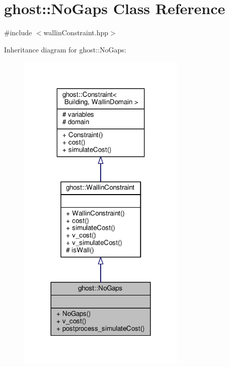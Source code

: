 \hypertarget{classghost_1_1NoGaps}{\section{ghost\-:\-:No\-Gaps Class Reference}
\label{classghost_1_1NoGaps}
}


{\ttfamily \#include $<$wallin\-Constraint.\-hpp$>$}



Inheritance diagram for ghost\-:\-:No\-Gaps\-:\nopagebreak
\begin{figure}[H]
\begin{center}
\leavevmode
\includegraphics[width=228pt]{classghost_1_1NoGaps__inherit__graph}
\end{center}
\end{figure}


